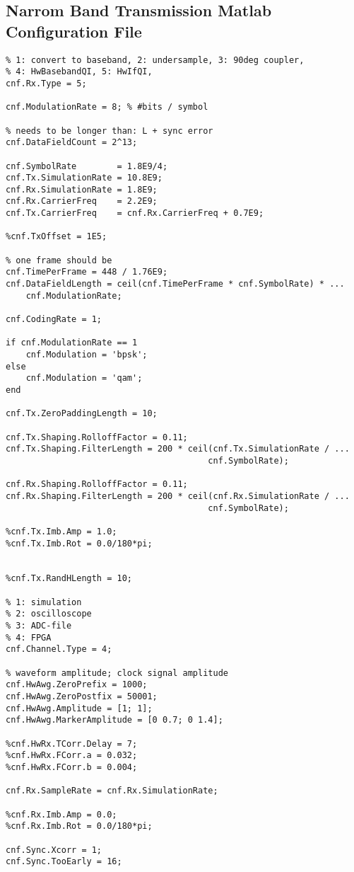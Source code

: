 \begin{appendix}
\chapter{Narrom Band Transmission Matlab Configuration File}
\label{app:res_450_cnf}
\begin{verbatim}
% 1: convert to baseband, 2: undersample, 3: 90deg coupler,
% 4: HwBasebandQI, 5: HwIfQI,
cnf.Rx.Type = 5;

cnf.ModulationRate = 8; % #bits / symbol

% needs to be longer than: L + sync error
cnf.DataFieldCount = 2^13;

cnf.SymbolRate        = 1.8E9/4;
cnf.Tx.SimulationRate = 10.8E9;
cnf.Rx.SimulationRate = 1.8E9;
cnf.Rx.CarrierFreq    = 2.2E9;
cnf.Tx.CarrierFreq    = cnf.Rx.CarrierFreq + 0.7E9;

%cnf.TxOffset = 1E5;

% one frame should be
cnf.TimePerFrame = 448 / 1.76E9;
cnf.DataFieldLength = ceil(cnf.TimePerFrame * cnf.SymbolRate) * ...
    cnf.ModulationRate;

cnf.CodingRate = 1;

if cnf.ModulationRate == 1
    cnf.Modulation = 'bpsk';
else
    cnf.Modulation = 'qam';
end

cnf.Tx.ZeroPaddingLength = 10;

cnf.Tx.Shaping.RolloffFactor = 0.11;
cnf.Tx.Shaping.FilterLength = 200 * ceil(cnf.Tx.SimulationRate / ...
                                        cnf.SymbolRate);

cnf.Rx.Shaping.RolloffFactor = 0.11;
cnf.Rx.Shaping.FilterLength = 200 * ceil(cnf.Rx.SimulationRate / ...
                                        cnf.SymbolRate);

%cnf.Tx.Imb.Amp = 1.0;
%cnf.Tx.Imb.Rot = 0.0/180*pi;


%cnf.Tx.RandHLength = 10;

% 1: simulation
% 2: oscilloscope
% 3: ADC-file
% 4: FPGA
cnf.Channel.Type = 4;

% waveform amplitude; clock signal amplitude
cnf.HwAwg.ZeroPrefix = 1000;
cnf.HwAwg.ZeroPostfix = 50001;
cnf.HwAwg.Amplitude = [1; 1];
cnf.HwAwg.MarkerAmplitude = [0 0.7; 0 1.4];

%cnf.HwRx.TCorr.Delay = 7;
%cnf.HwRx.FCorr.a = 0.032;
%cnf.HwRx.FCorr.b = 0.004;

cnf.Rx.SampleRate = cnf.Rx.SimulationRate;

%cnf.Rx.Imb.Amp = 0.0;
%cnf.Rx.Imb.Rot = 0.0/180*pi;

cnf.Sync.Xcorr = 1;
cnf.Sync.TooEarly = 16;


\end{verbatim}
\end{appendix}
